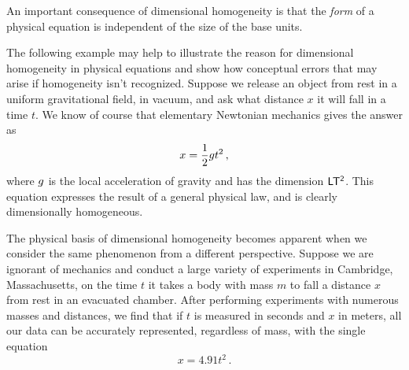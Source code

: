 An important consequence of dimensional homogeneity is that the \emph{form} of a physical equation is independent of the size of the base units.

The following example may help to illustrate the reason for dimensional homogeneity in physical equations and show how conceptual errors that may arise if homogeneity isn't recognized. Suppose we release an object from rest in a uniform gravitational field, in vacuum, and ask what distance $x$ it will fall in a time $t$. We know of course that elementary Newtonian mechanics gives the answer as
%
\begin{equation}\label{eq:freefalleqn}
x = \dfrac{1}{2}g t^2\,,
\end{equation}
%
where $g$ is the local acceleration of gravity and has the dimension $\mathsf{LT^2}$. This equation expresses the result of a general physical law, and is clearly dimensionally homogeneous.

The physical basis of dimensional homogeneity becomes apparent when we consider the same phenomenon from a different perspective. Suppose we are ignorant of mechanics and conduct a large variety of experiments in Cambridge, Massachusetts, on the time $t$ it takes a body with mass $m$ to fall a distance $x$ from rest in an evacuated chamber. After performing experiments with numerous masses and distances, we find that if $t$ is measured in seconds and $x$ in meters, all our data can be accurately represented, regardless of mass, with the single equation
%
\begin{equation}\label{eq:gravityinmassachusets}
x = 4.91 t^2\,.
\end{equation}
%

